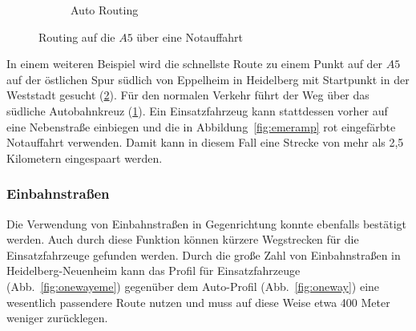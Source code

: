 \begin{figure}[htb]
\begin{subfigure}{0.49\textwidth}
\caption{Auto Routing}
\label{fig:normalramp}
\end{subfigure}
\caption{Routing auf die $A5$ über eine Notauffahrt}
\label{fig:ramp}
\end{figure}

In einem weiteren Beispiel wird die schnellste Route zu einem Punkt auf der $A5$ auf der östlichen Spur südlich von Eppelheim in Heidelberg mit Startpunkt in der Weststadt gesucht (\ref{fig:ramp}).
Für den normalen Verkehr führt der Weg über das südliche Autobahnkreuz (\ref{fig:normalramp}).
Ein Einsatzfahrzeug kann stattdessen vorher auf eine Nebenstraße einbiegen und die in Abbildung~\ref{fig:emeramp} rot eingefärbte Notauffahrt verwenden.
Damit kann in diesem Fall eine Strecke von mehr als 2,5 Kilometern eingespaart werden.

\subsubsection{Einbahnstraßen}

Die Verwendung von Einbahnstraßen in Gegenrichtung konnte ebenfalls bestätigt werden.
Auch durch diese Funktion können kürzere Wegstrecken für die Einsatzfahrzeuge gefunden werden. 
Durch die große Zahl von Einbahnstraßen in Heidelberg-Neuenheim kann das Profil für Einsatzfahrzeuge (Abb.~\ref{fig:onewayeme}) gegenüber dem Auto-Profil (Abb.~\ref{fig:oneway}) eine wesentlich passendere Route nutzen und muss auf diese Weise etwa 400 Meter weniger zurücklegen.

